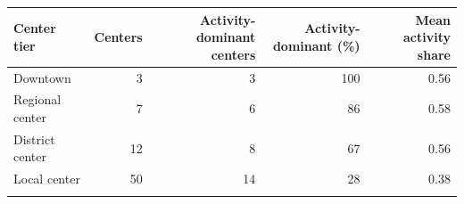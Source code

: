 \begin{tabular}{lrrrr}
\toprule
Center tier & Centers & Activity-dominant centers & Activity-dominant (\%) & Mean activity share \\
\midrule
Downtown & 3 & 3 & 100 & 0.56 \\
Regional center & 7 & 6 & 86 & 0.58 \\
District center & 12 & 8 & 67 & 0.56 \\
Local center & 50 & 14 & 28 & 0.38 \\
\botrule
\end{tabular}
